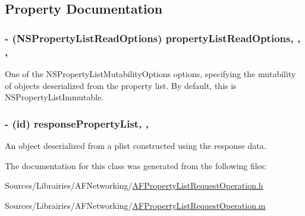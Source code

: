 \subsection{Property Documentation}
\hypertarget{interface_a_f_property_list_request_operation_a5fb606d19d4b174a207a695132f97f59}{
\subsubsection[{property\-List\-Read\-Options}]{\setlength{\rightskip}{0pt plus 5cm}-\/ (N\-S\-Property\-List\-Read\-Options) property\-List\-Read\-Options\hspace{0.3cm}{\ttfamily [read]}, {\ttfamily [write]}, {\ttfamily [nonatomic]}, {\ttfamily [assign]}}}\label{interface_a_f_property_list_request_operation_a5fb606d19d4b174a207a695132f97f59}
One of the {\ttfamily N\-S\-Property\-List\-Mutability\-Options} options, specifying the mutability of objects deserialized from the property list. By default, this is {\ttfamily N\-S\-Property\-List\-Immutable}. \hypertarget{interface_a_f_property_list_request_operation_aa58eb95915eb6912569d6b3a97d5ee97}{
\subsubsection[{response\-Property\-List}]{\setlength{\rightskip}{0pt plus 5cm}-\/ (id) response\-Property\-List\hspace{0.3cm}{\ttfamily [read]}, {\ttfamily [nonatomic]}, {\ttfamily [assign]}}}\label{interface_a_f_property_list_request_operation_aa58eb95915eb6912569d6b3a97d5ee97}
An object deserialized from a plist constructed using the response data. 

The documentation for this class was generated from the following files\-:\begin{DoxyCompactItemize}
\item 
Sources/\-Librairies/\-A\-F\-Networking/\hyperlink{_a_f_property_list_request_operation_8h}{A\-F\-Property\-List\-Request\-Operation.\-h}\item 
Sources/\-Librairies/\-A\-F\-Networking/\hyperlink{_a_f_property_list_request_operation_8m}{A\-F\-Property\-List\-Request\-Operation.\-m}\end{DoxyCompactItemize}
